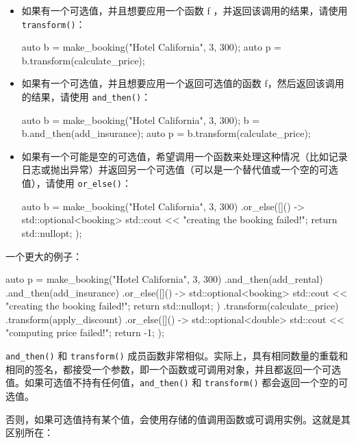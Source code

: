 \begin{itemize}
\item
如果有一个可选值，并且想要应用一个函数 f ，并返回该调用的结果，请使用 \verb|transform()|：

\begin{cpp}
auto b = make_booking("Hotel California", 3, 300);
auto p = b.transform(calculate_price);
\end{cpp}

\item
如果有一个可选值，并且想要应用一个返回可选值的函数 f，然后返回该调用的结果，请使用 \verb|and_then()|：

\begin{cpp}
auto b = make_booking("Hotel California", 3, 300);
     b = b.and_then(add_insurance);
auto p = b.transform(calculate_price);
\end{cpp}

\item
如果有一个可能是空的可选值，希望调用一个函数来处理这种情况（比如记录日志或抛出异常）并返回另一个可选值（可以是一个替代值或一个空的可选值），请使用 \verb|or_else()|：

\begin{cpp}
auto b = make_booking("Hotel California", 3, 300)
        .or_else([]() -> std::optional<booking> {
            std::cout << "creating the booking failed!\n";
            return std::nullopt;
        });
\end{cpp}
\end{itemize}

一个更大的例子：

\begin{cpp}
auto p =
    make_booking("Hotel California", 3, 300)
    .and_then(add_rental)
    .and_then(add_insurance)
    .or_else([]() -> std::optional<booking> {
        std::cout << "creating the booking failed!\n";
        return std::nullopt; })
    .transform(calculate_price)
    .transform(apply_discount)
    .or_else([]() -> std::optional<double> {
        std::cout << "computing price failed!\n"; return -1; });
\end{cpp}


\verb|and_then()| 和 \verb|transform()| 成员函数非常相似。实际上，具有相同数量的重载和相同的签名，都接受一个参数，即一个函数或可调用对象，并且都返回一个可选值。如果可选值不持有任何值，\verb|and_then()| 和 \verb|transform()| 都会返回一个空的可选值。

否则，如果可选值持有某个值，会使用存储的值调用函数或可调用实例。这就是其区别所在：

